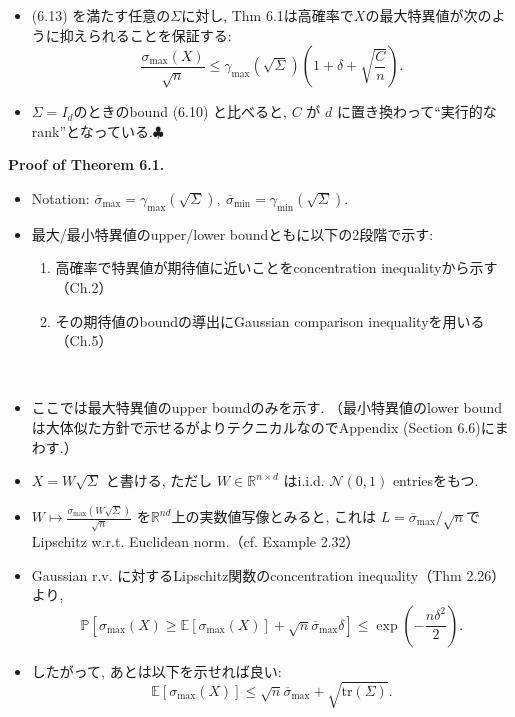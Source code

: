 \documentclass[unicode,aspectratio=169,11pt]{beamer}
\def\endexample{\hfill $\clubsuit$}
\newcommand{\ex}{\mathbb{E}}
\newcommand{\bb}{\mathbb}
\newcommand{\cc}{\mathcal}
\newcommand{\trace}{\mathrm{tr}}
\begin{document}
\begin{frame}{}
\begin{itemize}
  \item (6.13) を満たす任意の$\Sigma$に対し, Thm 6.1は高確率で$X$の最大特異値が次のように抑えられることを保証する:
  \[
      \frac{\sigma_{\max}(X)}{\sqrt{n}} \le \gamma_{\max}(\sqrt{\Sigma}) \left(1 + \delta + \sqrt{\frac{C}{n}}\right).
      \tag{6.15}
  \]
  \item $\Sigma = I_d$のときのbound (6.10) と比べると, $C$ が $d$ に置き換わって``実行的なrank''となっている.\endexample
\end{itemize}
\end{frame}

\begin{frame}{}{}
{\bf Proof of Theorem 6.1.}
\begin{itemize}
  \item Notation: $\overline{\sigma}_{\max} = \gamma_{\max}(\sqrt{\Sigma}),\ \overline{\sigma}_{\min} = \gamma_{\min}(\sqrt{\Sigma})$.
  \item 最大/最小特異値のupper/lower boundともに以下の2段階で示す:
  \begin{enumerate}
    \item 高確率で特異値が期待値に近いことをconcentration inequalityから示す（Ch.2）
    \item その期待値のboundの導出にGaussian comparison inequalityを用いる（Ch.5）
  \end{enumerate}
  　\\
  \item ここでは最大特異値のupper boundのみを示す.
        （最小特異値のlower boundは大体似た方針で示せるがよりテクニカルなのでAppendix (Section 6.6)にまわす.）
\end{itemize}
\end{frame}

\begin{frame}
  \begin{itemize}
    \item $X = W \sqrt{\Sigma}$ と書ける, ただし $W \in \bb{R}^{n\times d}$ はi.i.d. $\cc{N}(0,1)$ entriesをもつ.
    \item $W \mapsto \frac{\sigma_{\max}(W\sqrt{\Sigma})}{\sqrt{n}}$ を$\bb{R}^{nd}$上の実数値写像とみると, これは $L = \overline{\sigma}_{\max}/\sqrt{n}$でLipschitz w.r.t. Euclidean norm.（cf. Example 2.32）
    \item Gaussian r.v. に対するLipschitz関数のconcentration inequality（Thm 2.26）より,
          \[
            \bb{P}\left[\sigma_{\max}(X) \ge \ex[\sigma_{\max}(X)] + \sqrt{n} \overline{\sigma}_{\max} \delta\right]
            \le \exp\left(-\frac{n \delta^2}{2}\right).
          \]
    \item したがって, あとは以下を示せれば良い:
          \[
            \ex[\sigma_{\max}(X)] \le \sqrt{n} \overline{\sigma}_{\max} + \sqrt{\trace(\Sigma)}. \tag{6.16}
          \]
  \end{itemize}
\end{frame}
\end{document}
